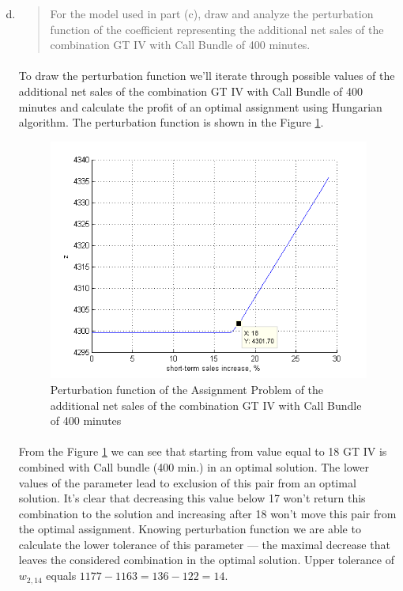 \begin{enumerate}[(a)]
\setcounter{enumi}{3}
\item\begin{quote}For the model used in part (c), draw and analyze the perturbation function of the
coefficient representing the additional net sales of the combination GT IV with
Call Bundle of 400 minutes.\end{quote}

	\paragraph{}
	To draw the perturbation function we'll iterate through possible values of the additional net sales of the combination GT IV with
Call Bundle of 400 minutes and calculate the profit of an optimal assignment using Hungarian algorithm. The perturbation function is shown in the Figure \ref{perturbation-5-d}.

\begin{figure}[H]
	\centering
	\includegraphics[scale=1]{./img/perturbation-5-d.png}
	\caption{Perturbation function of the Assignment Problem of the additional net sales of the combination GT IV with Call Bundle of 400 minutes}
	\label{perturbation-5-d}
\end{figure}

	\paragraph{}
	From the Figure \ref{perturbation-5-d} we can see that starting from value equal to 18 GT IV is combined with Call bundle (400 min.) in an optimal solution. The lower values of the parameter lead to exclusion of this pair from an optimal solution. It's clear that decreasing this value below 17 won't return this combination to the solution and increasing after 18 won't move this pair from the optimal assignment. Knowing perturbation function we are able to calculate the lower tolerance of this parameter --- the maximal decrease that leaves the considered combination in the optimal solution. Upper tolerance of $w_{2,14}$ equals $1177 - 1163 = 136 - 122 = 14$.



\end{enumerate}